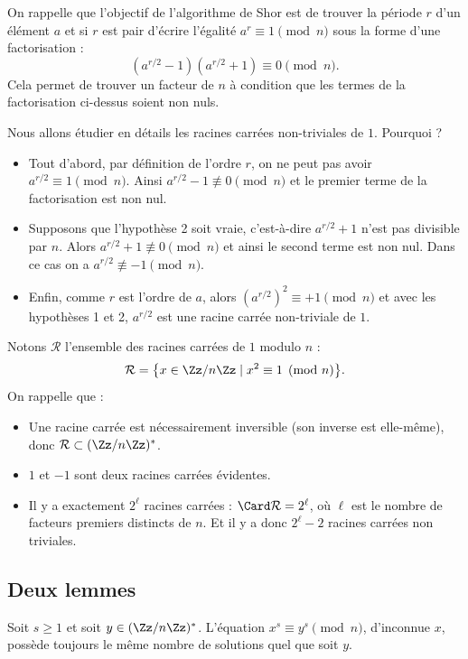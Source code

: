 \documentclass[11pt,class=report,crop=false]{standalone}
\begin{document}
On rappelle que l'objectif de l'algorithme de Shor est de trouver la période $r$ d'un élément $a$ et si $r$ est pair d'écrire l'égalité $a^r \equiv 1 \pmod n$ sous la forme d'une factorisation :
$$(a^{r/2}-1)(a^{r/2}+1) \equiv 0 \pmod n.$$
Cela permet de trouver un facteur de $n$ à condition que les termes de la factorisation ci-dessus soient non nuls.

Nous allons étudier en détails les racines carrées non-triviales de $1$.
Pourquoi ?
\begin{itemize}
  \item Tout d'abord, par définition de l'ordre $r$, on ne peut pas avoir $a^{r/2}\equiv 1 \pmod n$. Ainsi $a^{r/2}-1 \not\equiv 0 \pmod n$ et le premier terme de la factorisation est non nul.
  \item Supposons que l'hypothèse 2 soit vraie, c'est-à-dire $a^{r/2}+1$ n'est pas divisible par $n$. Alors $a^{r/2}+1 \not\equiv 0 \pmod n$ et ainsi le second terme est non nul. Dans ce cas on a $a^{r/2} \not\equiv -1 \pmod n$.
  \item Enfin, comme $r$ est l'ordre de $a$, alors $(a^{r/2})^2 \equiv +1 \pmod n$
et avec les hypothèses 1 et 2, $a^{r/2}$ est une racine carrée non-triviale de $1$.
\end{itemize}

\bigskip

Notons $\mathcal{R}$ l'ensemble des racines carrées de $1$ modulo $n$ :
$$\mathcal{R} = \big\{ x \in \Zz/n\Zz \mid x^2 \equiv 1 \pmod n \big\}.$$
On rappelle que :
\begin{itemize}
  \item Une racine carrée est nécessairement inversible (son inverse est elle-même), donc $\mathcal{R} \subset (\Zz/n\Zz)^*$.
  \item $1$ et $-1$ sont deux racines carrées évidentes.
  \item Il y a exactement $2^\ell$ racines carrées : $\Card \mathcal{R} = 2^\ell$, où $\ell$ est le nombre de facteurs premiers distincts de $n$. Et il y a donc $2^\ell-2$ racines carrées non triviales.
\end{itemize}

\subsection{Deux lemmes}

\begin{lemme}
\label{lem:xs1}
Soit $s\ge1$ et soit $y\in(\Zz/n\Zz)^*$. L'équation $x^s \equiv y^s \pmod n$, d'inconnue $x$, possède toujours le même nombre de solutions quel que soit $y$. 
\end{lemme}
\end{document}
